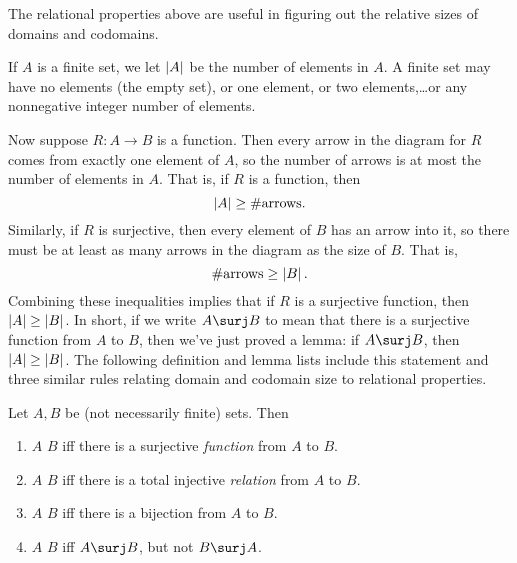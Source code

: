 \label{mappingrule_sec}

The relational properties above are useful in figuring out the relative
sizes of domains and codomains.

If $A$ is a finite set, we let $\left|A\right|$ be the number of elements in
$A$.  A finite set may have no elements (the empty set), or one element,
or two elements,\dots or any nonnegative integer number of elements.

Now suppose $R:A \to B$ is a function.  Then every arrow in the diagram
for $R$ comes from exactly one element of $A$, so the number of arrows is
at most the number of elements in $A$.  That is, if $R$ is a function,
then
\[
\left|A\right| \geq \#\text{arrows}.
\]
Similarly, if $R$ is surjective, then every element of $B$ has an arrow
into it, so there must be at least as many arrows in the diagram as the
size of $B$.  That is,
\[
\#\text{arrows} \geq \left|B\right|.
\]
Combining these inequalities implies that if $R$ is a surjective function,
then $\left|A\right| \geq \left|B\right|$.  In short, if we write $A \surj B$ to mean
that there is a surjective function from $A$ to $B$, then we've just
proved a lemma: if $A \surj B$, then $\left|A\right| \geq \left|B\right|$.  The
following definition and lemma lists include this statement and three
similar rules relating domain and codomain size to relational properties.

\begin{definition}\label{bigger}
  Let $A,B$ be (not necessarily finite) sets.  Then
  \begin{enumerate}
  \item $A$ \term{$\surj$} $B$ iff there is a surjective \emph{function} from $A$ to $B$.  

  \item $A$ \term{$\inj$} $B$ iff there is a total injective \emph{relation} from $A$ to $B$.

  \item $A$ \term{$\bij$} $B$ iff there is a bijection from $A$ to $B$.  

  \item $A$ \term{$\strict$} $B$ iff $A \surj B$, but not $B \surj A$.  

  \end{enumerate}
\end{definition}



